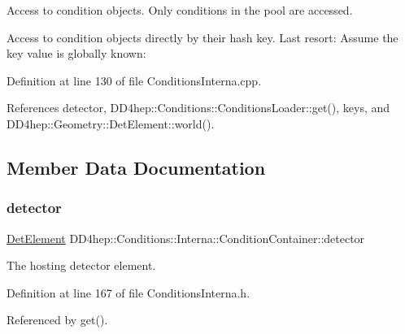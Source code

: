 Access to condition objects. Only conditions in the pool are accessed. 

Access to condition objects directly by their hash key. Last resort\+: Assume the key value is globally known\+: 

Definition at line 130 of file Conditions\+Interna.\+cpp.



References detector, D\+D4hep\+::\+Conditions\+::\+Conditions\+Loader\+::get(), keys, and D\+D4hep\+::\+Geometry\+::\+Det\+Element\+::world().



\subsection{Member Data Documentation}
\hypertarget{class_d_d4hep_1_1_conditions_1_1_interna_1_1_condition_container_aea33e2b2bf7d2ee4db38f87d2f231a2e}{}\label{class_d_d4hep_1_1_conditions_1_1_interna_1_1_condition_container_aea33e2b2bf7d2ee4db38f87d2f231a2e} 
\subsubsection{\texorpdfstring{detector}{detector}}
{\footnotesize\ttfamily \hyperlink{class_d_d4hep_1_1_geometry_1_1_det_element}{Det\+Element} D\+D4hep\+::\+Conditions\+::\+Interna\+::\+Condition\+Container\+::detector}



The hosting detector element. 



Definition at line 167 of file Conditions\+Interna.\+h.



Referenced by get().

\hypertarget{class_d_d4hep_1_1_conditions_1_1_interna_1_1_condition_container_a80876b929c712092fb1e036e1916f621}{}\label{class_d_d4hep_1_1_conditions_1_1_interna_1_1_condition_container_a80876b929c712092fb1e036e1916f621} 
